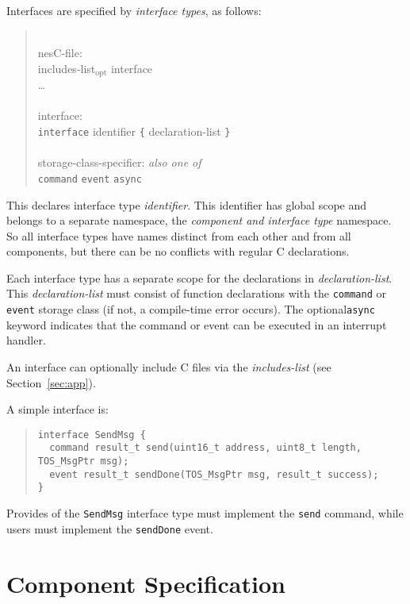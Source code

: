 \documentclass[11pt,letterpaper]{article}
\newcommand{\kw}[1]{{\tt #1}}
\newcommand{\code}[1]{{\tt #1}}
\newcommand{\opt}{$_{\mbox{opt}}$\xspace}
\newcommand{\grammarshift}{\vspace*{-.7cm}}
\newcommand{\grammarindent}{\hspace*{2cm}\= \\ \kill}
\begin{document}
Interfaces are specified by \emph{interface types}, as follows:
\begin{quote} \grammarshift
\em \begin{tabbing}
\grammarindent
nesC-file: \\
\>	includes-list\opt interface\\
\>	\ldots\\
\\
interface:\\
\>	\kw{interface} identifier \kw{\{} declaration-list \kw{\}}\\
\\
storage-class-specifier: \emph{also one of}\\
\>	\kw{command} \kw{event} \kw{async}\\
\end{tabbing}
\end{quote}
This declares interface type \emph{identifier}. This identifier has global
scope and belongs to a separate namespace, the \emph{component and
interface type} namespace. So all interface types have names distinct from
each other and from all components, but there can be no conflicts with
regular C declarations.

Each interface type has a separate scope for the declarations in
\emph{declaration-list}. This \emph{declaration-list} must consist of
function declarations with the \kw{command} or \kw{event} storage class (if
not, a compile-time error occurs). The optional\kw{async} keyword indicates
that the command or event can be executed in an interrupt handler.

An interface can optionally include C files via the \emph{includes-list}
(see Section~\ref{sec:app}).

A simple interface is:
\begin{quote} \begin{verbatim}
interface SendMsg { 
  command result_t send(uint16_t address, uint8_t length, TOS_MsgPtr msg);
  event result_t sendDone(TOS_MsgPtr msg, result_t success);
}
\end{verbatim} \end{quote}

Provides of the \code{SendMsg} interface type must implement the
\code{send} command, while users must implement the \code{sendDone} event.

\section{Component Specification}
\label{sec:component}
\end{document}
